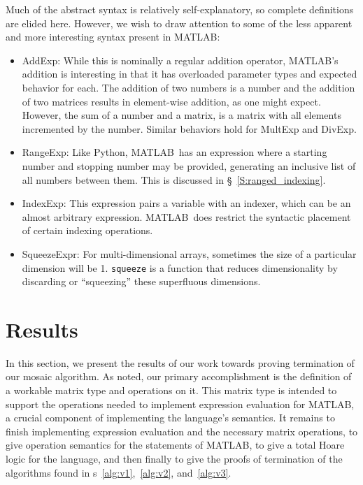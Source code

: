 \documentclass[11pt,conference]{IEEEtran}
\newcommand{\matlab}{MATLAB}
\newcommand{\mmatlab}{\textmu\matlab}
\theoremstyle{plain} %
\theoremstyle{definition}
\theoremstyle{remark}
\begin{document}
Much of the abstract syntax is relatively self-explanatory, so complete
definitions are elided here. However, we wish to draw attention to some of the
less apparent and more interesting syntax present in \mmatlab:

\begin{itemize}

    \item \textsf{AddExp}: While this is nominally a regular addition operator,
        \matlab's addition is interesting in that it has overloaded parameter
        types and expected behavior for each. The addition of two numbers is a
        number and the addition of two matrices results in element-wise
        addition, as one might expect. However, the sum of a number and a
        matrix, is a matrix with all elements incremented by the number. Similar
        behaviors hold for \textsf{MultExp} and \textsf{DivExp}.

    \item \textsf{RangeExp}: Like Python, \matlab\ has an expression where a
        starting number and stopping number may be provided, generating an
        inclusive list of all numbers between them. This is discussed in
        \S~\ref{S:ranged_indexing}.

    \item \textsf{IndexExp}: This expression pairs a variable with an indexer,
        which can be an almost arbitrary expression. \matlab\ does restrict the
        syntactic placement of certain indexing operations.

    \item \textsf{SqueezeExpr}: For multi-dimensional arrays, sometimes the size
        of a particular dimension will be 1. \texttt{squeeze} is a function that
        reduces dimensionality by discarding or ``squeezing'' these superfluous
        dimensions.

\end{itemize}

\section{Results}\label{S:results}

In this section, we present the results of our work towards proving termination
of our mosaic algorithm. As noted, our primary accomplishment is the definition
of a workable matrix type and operations on it. This matrix type is intended to
support the operations needed to implement expression evaluation for \mmatlab, a
crucial component of implementing the language's semantics. It remains to finish
implementing expression evaluation and the necessary matrix operations, to give
operation semantics for the statements of \mmatlab, to give a total Hoare logic
for the language, and then finally to give the proofs of termination of the
algorithms found in \figurename{s}~\ref{alg:v1},~\ref{alg:v2}, and~\ref{alg:v3}.
\end{document}
